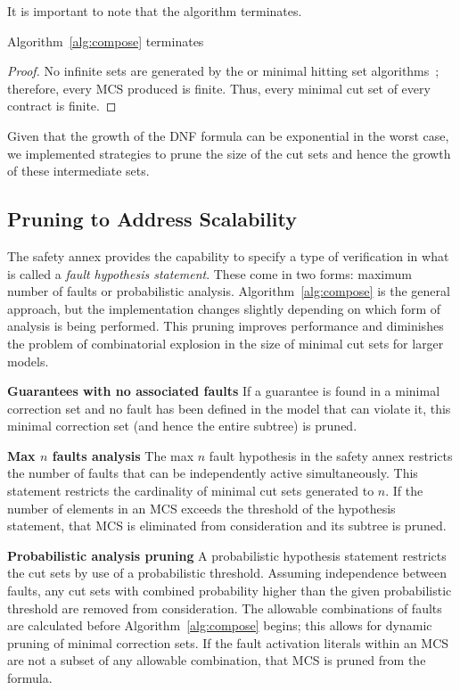 It is important to note that the algorithm terminates. 
\begin{theorem}
Algorithm~\ref{alg:compose} terminates
\begin{proof}
No infinite sets are generated by the \aivcalg or minimal hitting set algorithms~\cite{Ghassabani2017EfficientGO,murakami2013efficient}; therefore, every MCS produced is finite. Thus, every minimal cut set of every contract is finite.
\end{proof}
\end{theorem}

Given that the growth of the DNF formula can be exponential in the worst case, we implemented strategies to prune the size of the cut sets and hence the growth of these intermediate sets. 


\subsection{Pruning to Address Scalability}
The safety annex provides the capability to specify a type of verification in what is called a \textit{fault hypothesis statement}. These come in two forms: maximum number of faults or probabilistic analysis. Algorithm~\ref{alg:compose} is the general approach, but the implementation changes slightly depending on which form of analysis is being performed. This pruning improves performance and diminishes the problem of combinatorial explosion in the size of minimal cut sets for larger models. 

\textbf{Guarantees with no associated faults} If a guarantee is found in a minimal correction set and no fault has been defined in the model that can violate it, this minimal correction set (and hence the entire subtree) is pruned.

\textbf{Max $n$ faults analysis} The max $n$ fault hypothesis in the safety annex restricts the number of faults that can be independently active simultaneously. This statement restricts the cardinality of minimal cut sets generated to $n$. If the number of elements in an MCS exceeds the threshold of the hypothesis statement, that MCS is eliminated from consideration and its subtree is pruned.


\textbf{Probabilistic analysis pruning} A probabilistic hypothesis statement restricts the cut sets by use of a probabilistic threshold. Assuming independence between faults, any cut sets with combined probability higher than the given probabilistic threshold are removed from consideration. The allowable combinations of faults are calculated before Algorithm~\ref{alg:compose} begins; this allows for dynamic pruning of minimal correction sets. If the fault activation literals within an MCS are not a subset of any allowable combination, that MCS is pruned from the formula. 

